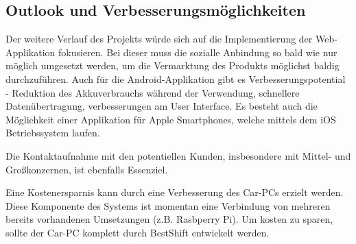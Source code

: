\subsection{Outlook und Verbesserungsmöglichkeiten}

Der weitere Verlauf des Projekts würde sich auf die Implementierung der Web-Applikation fokusieren. Bei dieser muss die sozialle Anbindung so bald wie nur möglich umgesetzt werden, um die Vermarktung des Produkts möglichst baldig durchzuführen. Auch für die Android-Applikation gibt es Verbesserungspotential - Reduktion des Akkuverbrauchs während der Verwendung, schnellere Datenübertragung, verbesserungen am User Interface. Es besteht auch die Möglichkeit einer Applikation für Apple Smartphones, welche mittels dem iOS Betriebssystem laufen.

Die Kontaktaufnahme mit den potentiellen Kunden, insbesondere mit Mittel- und Großkonzernen, ist ebenfalls Es­sen­zi­el. 

Eine Kostenersparnis kann durch eine Verbesserung des Car-PCs erzielt werden. Diese Komponente des Systems ist momentan eine Verbindung von mehreren bereits vorhandenen Umsetzungen (z.B. Rasbperry Pi). Um kosten zu sparen, sollte der Car-PC komplett durch BestShift entwickelt werden.


\clearpage %